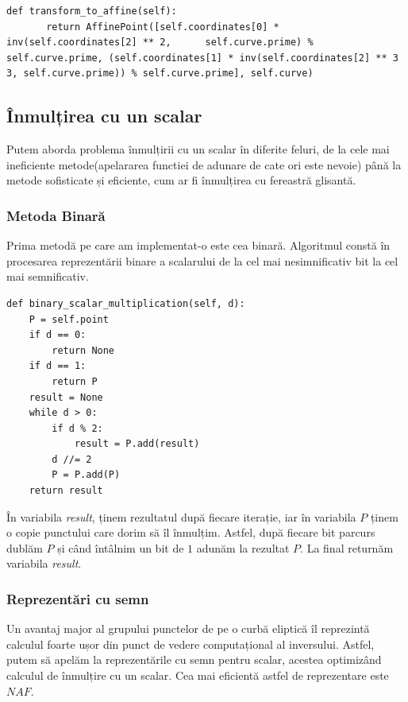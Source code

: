 \begin{lstlisting}
def transform_to_affine(self):
       return AffinePoint([self.coordinates[0] * inv(self.coordinates[2] ** 2, 	    self.curve.prime) % self.curve.prime, (self.coordinates[1] * inv(self.coordinates[2] ** 3  3, self.curve.prime)) % self.curve.prime], self.curve)
\end{lstlisting}

\subsection{Înmulțirea cu un scalar}

Putem aborda problema înmulțirii cu un scalar în diferite feluri, de la cele mai ineficiente metode(apelararea functiei de adunare de cate ori este nevoie) până la metode sofisticate și eficiente, cum ar fi înmulțirea cu fereastră glisantă.

\subsubsection{Metoda Binară}

Prima metodă pe care am implementat-o este cea binară. Algoritmul constă în procesarea reprezentării binare a scalarului de la cel mai nesimnificativ bit la cel mai semnificativ.

\begin{lstlisting}
def binary_scalar_multiplication(self, d):
    P = self.point
    if d == 0:
        return None
    if d == 1:
        return P
    result = None
    while d > 0:
        if d % 2:
            result = P.add(result)
        d //= 2
        P = P.add(P)
    return result
\end{lstlisting}

În variabila \textit{result}, ținem rezultatul după fiecare iterație, iar în variabila $P$ ținem o copie punctului care dorim să îl înmulțim. Astfel, după fiecare bit parcurs dublăm $P$ și când întâlnim un bit de $1$ adunăm la rezultat $P$. La final returnăm variabila \textit{result}.

\subsubsection{Reprezentări cu semn}

Un avantaj major al grupului punctelor de pe o curbă eliptică îl reprezintă calculul foarte ușor din punct de vedere computațional al inversului. Astfel, putem să apelăm la reprezentările cu semn pentru scalar, acestea optimizând calculul de înmulțire cu un scalar. Cea mai eficientă astfel de reprezentare este $NAF$. \\

